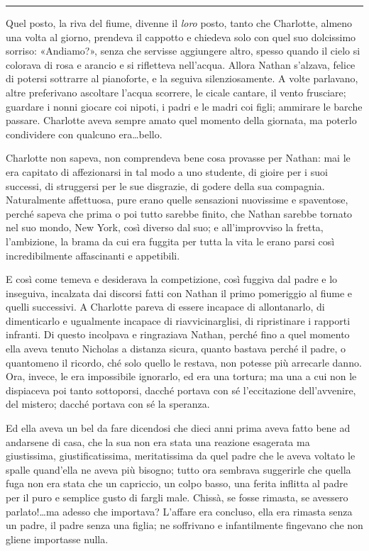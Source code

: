 \plainbreak{1}

Quel posto, la riva del fiume, divenne il \emph{loro} posto, tanto che Charlotte, almeno una volta
al giorno, prendeva il cappotto e chiedeva solo con quel suo dolcissimo sorriso: «Andiamo?», senza
che servisse aggiungere altro, spesso quando il cielo si colorava di rosa e arancio e si rifletteva
nell'acqua. Allora Nathan s'alzava, felice di potersi sottrarre al pianoforte, e la seguiva
silenziosamente. A volte parlavano, altre preferivano ascoltare l'acqua scorrere, le cicale cantare,
il vento frusciare; guardare i nonni giocare coi nipoti, i padri e le madri coi figli; ammirare le
barche passare. Charlotte aveva sempre amato quel momento della giornata, ma poterlo condividere con
qualcuno era\dots bello.

Charlotte non sapeva, non comprendeva bene cosa provasse per Nathan: mai le era capitato di
affezionarsi in tal modo a uno studente, di gioire per i suoi successi, di struggersi per le sue
disgrazie, di godere della sua compagnia. Naturalmente affettuosa, pure erano quelle sensazioni
nuovissime e spaventose, perché sapeva che prima o poi tutto sarebbe finito, che Nathan sarebbe
tornato nel suo mondo, New York, così diverso dal suo; e all'improvviso la fretta, l'ambizione, la
brama da cui era fuggita per tutta la vita le erano parsi così incredibilmente affascinanti e
appetibili.

E così come temeva e desiderava la competizione, così fuggiva dal padre e lo inseguiva, incalzata
dai discorsi fatti con Nathan il primo pomeriggio al fiume e quelli successivi. A Charlotte pareva
di essere incapace di allontanarlo, di dimenticarlo e ugualmente incapace di riavvicinarglisi, di
ripristinare i rapporti infranti. Di questo incolpava e ringraziava Nathan, perché fino a quel
momento ella aveva tenuto Nicholas a distanza sicura, quanto bastava perché il padre, o quantomeno
il ricordo, ché solo quello le restava, non potesse più arrecarle danno. Ora, invece, le era
impossibile ignorarlo, ed era una tortura; ma una a cui non le dispiaceva poi tanto sottoporsi,
dacché portava con sé l'eccitazione dell'avvenire, del mistero; dacché portava con sé la speranza.

Ed ella aveva un bel da fare dicendosi che dieci anni prima aveva fatto bene ad andarsene di casa,
che la sua non era stata una reazione esagerata ma giustissima, giustificatissima, meritatissima da
quel padre che le aveva voltato le spalle quand'ella ne aveva più bisogno; tutto ora sembrava
suggerirle che quella fuga non era stata che un capriccio, un colpo basso, una ferita inflitta al
padre per il puro e semplice gusto di fargli male. Chissà, se fosse rimasta, se avessero
parlato!\dots ma adesso che importava? L'affare era concluso, ella era rimasta senza un padre, il
padre senza una figlia; ne soffrivano e infantilmente fingevano che non gliene importasse nulla.

